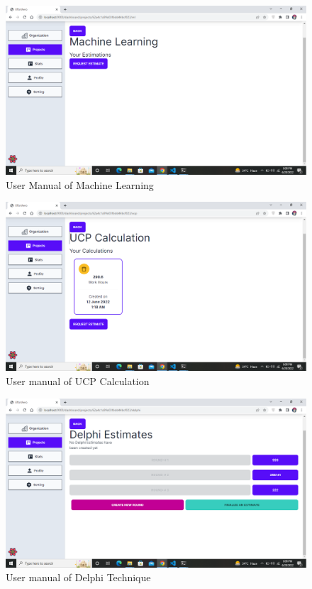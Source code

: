 \begin{figure}[H]
    \centering
    \includegraphics[scale=0.4]{./diagrams/user-manual/Screenshot (33).png}
    \caption{User Manual of Machine Learning}
    \label{fig:user-1}

\end{figure}

\begin{figure}[H]
    \centering
    \includegraphics[scale=0.4]{./diagrams/user-manual/Screenshot (34).png}
    \caption{User manual of UCP Calculation}
    \label{fig:user-1}

\end{figure}

\begin{figure}[H]
    \centering
    \includegraphics[scale=0.4]{./diagrams/user-manual/Screenshot (35).png}
    \caption{User manual of Delphi Technique}
    \label{fig:user-1}

\end{figure}

